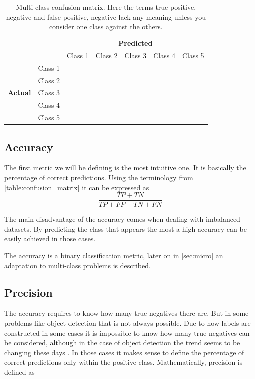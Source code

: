 \begin{table}[ht]
\centering
\caption{Multi-class confusion matrix. Here the terms true positive, negative and false positive, negative lack any meaning unless you consider one class against the others.}
\label{table:confusion_matrix2}
\begin{tabular}{c c c|c|c|c|c|}
& & \multicolumn{5}{c}{\textbf{Predicted}} \\ \cline{3-7}
& & \multicolumn{1}{|c|}{Class 1} & Class 2 & Class 3 & Class 4 & Class 5 \\ \cline{2-7}
\multirow{5}{*}{\textbf{Actual}} & \multicolumn{1}{|c|}{Class 1} & & & & & \\ \cline{2-7}
                     & \multicolumn{1}{|c|}{Class 2} & & & & & \\ \cline{2-7}
                     & \multicolumn{1}{|c|}{Class 3} & & & & & \\ \cline{2-7}
                     & \multicolumn{1}{|c|}{Class 4} & & & & & \\ \cline{2-7}
                     & \multicolumn{1}{|c|}{Class 5} & & & & & \\ \cline{2-7}
\end{tabular}
\end{table}

\subsection{Accuracy}\label{sec:acc}

The first metric we will be defining is the most intuitive one. It is basically the percentage of correct predictions. Using the terminology from \autoref{table:confusion_matrix} it can be expressed as 
\begin{equation}
    \frac{TP + TN}{TP + FP + TN + FN}
\end{equation}

The main disadvantage of the accuracy comes when dealing with imbalanced datasets. By predicting the class that appears the most a high accuracy can be easily achieved in those cases.

The accuracy is a binary classification metric, later on in \autoref{sec:micro} an adaptation to multi-class problems is described.

\subsection{Precision}

The accuracy requires to know how many true negatives there are. But in some problems like object detection that is not always possible. Due to how labels are constructed in some cases it is impossible to know how many true negatives can be considered, although in the case of object detection the trend seems to be changing these days \cite{kirillov2023segment}. In those cases it makes sense to define the percentage of correct predictions only within the positive class. Mathematically, precision is defined as

